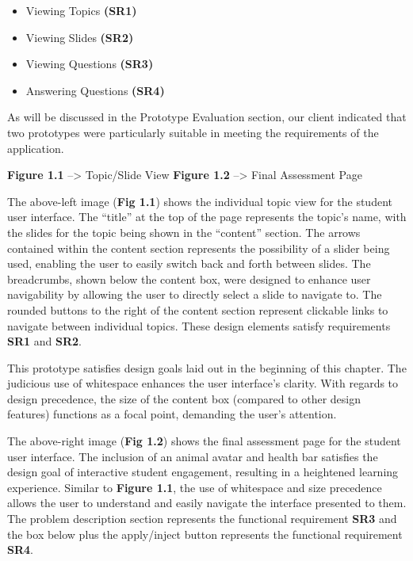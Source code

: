 \documentclass{l3proj}
\begin{document}
\begin{itemize}
\item{Viewing Topics\textbf{ (SR1)}}
\item{Viewing Slides\textbf{ (SR2)}}
\item{Viewing Questions\textbf{ (SR3)}}
\item{Answering Questions\textbf{ (SR4)}}
\end{itemize}

As will be discussed in the Prototype Evaluation section, our client indicated that two prototypes were particularly suitable in meeting the requirements of the application.

\textbf{Figure 1.1} --> Topic/Slide View 		\textbf{Figure 1.2} --> Final Assessment Page

The above-left image (\textbf{Fig 1.1}) shows the individual topic view for the student user interface. The ``title'' at the top of the page represents the topic's name, with the slides for the topic being shown in the ``content'' section. The arrows contained within the content section represents the possibility of a slider being used, enabling the user to easily switch back and forth between slides. The breadcrumbs, shown below the content box, were designed to enhance user navigability by allowing the user to directly select a slide to navigate to. The rounded buttons to the right of the content section represent clickable links to navigate between individual topics. These design elements satisfy requirements \textbf{SR1} and \textbf{SR2}.

This prototype satisfies design goals laid out in the beginning of this chapter. The judicious use of whitespace enhances the user interface's clarity. With regards to design precedence, the size of the content box (compared to other design features) functions as a focal point, demanding the user's attention. 

The above-right image (\textbf{Fig 1.2}) shows the final assessment page for the student user interface. The inclusion of an animal avatar and health bar satisfies the design goal of interactive student engagement, resulting in a heightened learning experience. Similar to \textbf{Figure 1.1}, the use of whitespace and size precedence allows the user to understand and easily navigate the interface presented to them. The problem description section represents the functional requirement \textbf{SR3} and the box below plus the apply/inject button represents the functional requirement \textbf{SR4}.  
\end{document}
